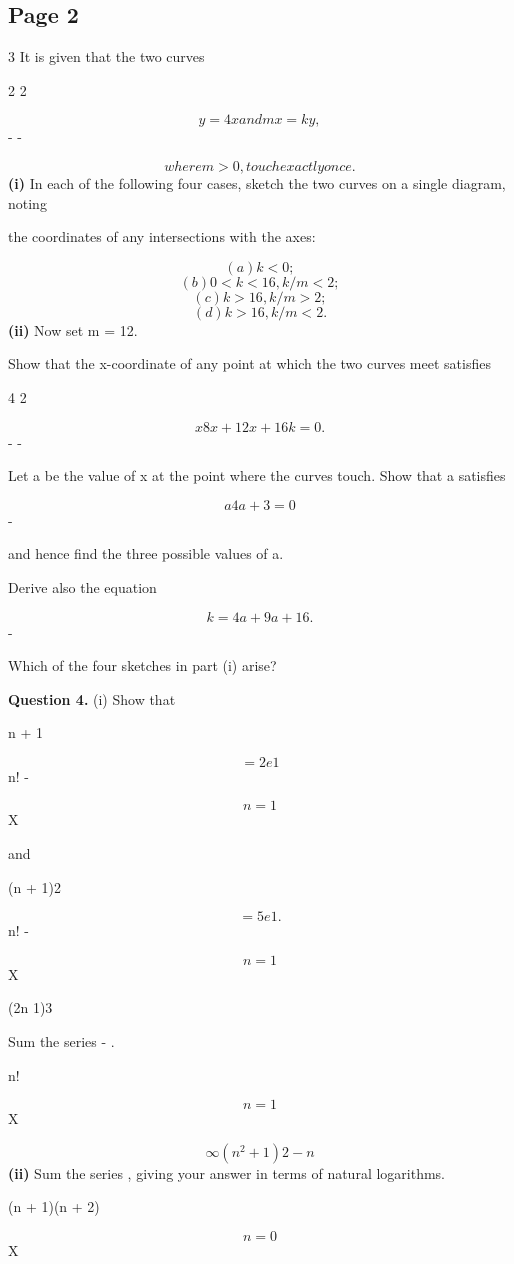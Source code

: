 \documentclass[12pt]{article}
\begin{document}
\subsection*{Page 2}
\begin{flushleft}
3 It is given that the two curves\par
2 2\par
\[y = 4 x and mx = k y ,\]
- -\par
\[where m > 0, touch exactly once.\]
\textbf{(i)} In each of the following four cases, sketch the two curves on a single diagram, noting\par
the coordinates of any intersections with the axes:\par
\[(a) k < 0 ;\]
\[(b) 0 < k < 16, k/m < 2 ;\]
\[(c) k > 16, k/m > 2 ;\]
\[(d) k > 16, k/m < 2 .\]
\textbf{(ii)} Now set m = 12.\par
Show that the x-coordinate of any point at which the two curves meet satisfies\par
4 2\par
\[x 8x + 12x + 16 k = 0 .\]
- -\par
Let a be the value of x at the point where the curves touch. Show that a satisfies\par
\[a 4a + 3 = 0\]
-\par
and hence find the three possible values of a.\par
Derive also the equation\par
\[k = 4a + 9a + 16 .\]
-\par
Which of the four sketches in part (i) arise?\par
\bigskip\textbf{Question 4.} (i) Show that\par
\infty\par
n + 1\par
\[= 2e 1\]
n! -\par
\[n=1\]
X\par
and\par
\infty\par
(n + 1)2\par
\[= 5e 1 .\]
n! -\par
\[n=1\]
X\par
\infty\par
(2n 1)3\par
Sum the series - .\par
n!\par
\[n=1\]
X\par
\[\infty (n^2 + 1)2 -n\]
\textbf{(ii)} Sum the series , giving your answer in terms of natural logarithms.\par
(n + 1)(n + 2)\par
\[n=0\]
X\par
\end{flushleft}
\end{document}
